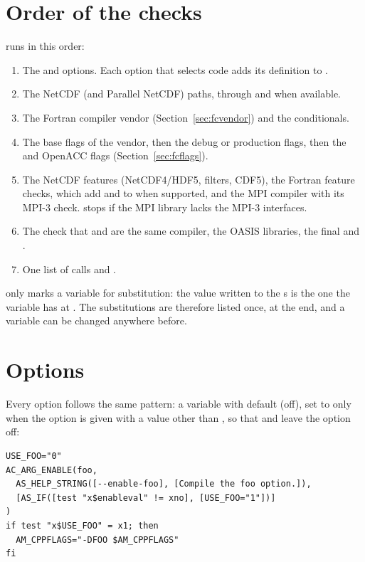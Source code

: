 \section{Order of the checks}

 runs in this order:

\begin{enumerate}
  \item The  and  options. Each option that
    selects code adds its definition to .
  \item The NetCDF (and Parallel NetCDF) paths, through 
    and  when available.
  \item The Fortran compiler vendor (Section~\ref{sec:fcvendor}) and the
     conditionals.
  \item The base flags of the vendor, then the debug or production flags,
    then the  and OpenACC flags
    (Section~\ref{sec:fcflags}).
  \item The NetCDF features (NetCDF4/HDF5, filters, CDF5), the Fortran
    feature checks, which add  and 
    to  when supported, and the MPI compiler with its MPI-3
    check.  stops if the MPI library lacks the MPI-3
    interfaces.
  \item The check that  and  are the same compiler,
    the OASIS libraries, the final  and .
  \item One list of  calls and .
\end{enumerate}

 only marks a variable for substitution: the value written
to the s is the one the variable has at .
The substitutions are therefore listed once, at the end, and a variable
can be changed anywhere before.

\section{Options}

Every  option follows the same pattern: a variable with
default  (off), set to  only when the option is given with a
value other than , so that  and
 leave the option off:

\begin{lstlisting}
USE_FOO="0"
AC_ARG_ENABLE(foo,
  AS_HELP_STRING([--enable-foo], [Compile the foo option.]),
  [AS_IF([test "x$enableval" != xno], [USE_FOO="1"])]
)
if test "x$USE_FOO" = x1; then
  AM_CPPFLAGS="-DFOO $AM_CPPFLAGS"
fi
\end{lstlisting}

